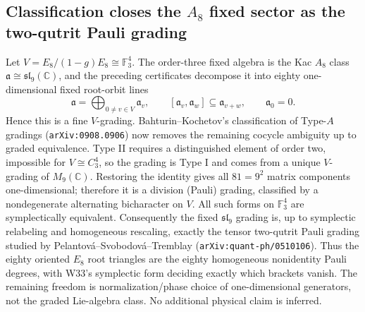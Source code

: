 \subsection{Classification closes the $A_8$ fixed sector as the two-qutrit Pauli grading}
Let $V=E_8/(1-g)E_8\cong\mathbb F_3^4$.  The order-three fixed algebra is the
Kac $A_8$ class $\mathfrak a\cong\mathfrak{sl}_9(\mathbb C)$, and the preceding
certificates decompose it into eighty one-dimensional fixed root-orbit lines
\[
 \mathfrak a=\bigoplus_{0\ne v\in V}\mathfrak a_v,
 \qquad [\mathfrak a_v,\mathfrak a_w]\subseteq\mathfrak a_{v+w},
 \qquad \mathfrak a_0=0.
\]
Hence this is a fine $V$-grading.  Bahturin--Kochetov's classification of
Type-$A$ gradings (\texttt{arXiv:0908.0906}) now removes the remaining cocycle
ambiguity up to graded equivalence.  Type II requires a distinguished element
of order two, impossible for $V\cong C_3^4$, so the grading is Type I and comes
from a unique $V$-grading of $M_9(\mathbb C)$.  Restoring the identity gives
all $81=9^2$ matrix components one-dimensional; therefore it is a division
(Pauli) grading, classified by a nondegenerate alternating bicharacter on $V$.
All such forms on $\mathbb F_3^4$ are symplectically equivalent.  Consequently
the fixed $\mathfrak{sl}_9$ grading is, up to symplectic relabeling and
homogeneous rescaling, exactly the tensor two-qutrit Pauli grading studied by
Pelantov\'a--Svobodov\'a--Tremblay
(\texttt{arXiv:quant-ph/0510106}).  Thus the eighty oriented $E_8$ root
triangles are the eighty homogeneous nonidentity Pauli degrees, with W33's
symplectic form deciding exactly which brackets vanish.  The remaining freedom
is normalization/phase choice of one-dimensional generators, not the graded
Lie-algebra class.  No additional physical claim is inferred.
